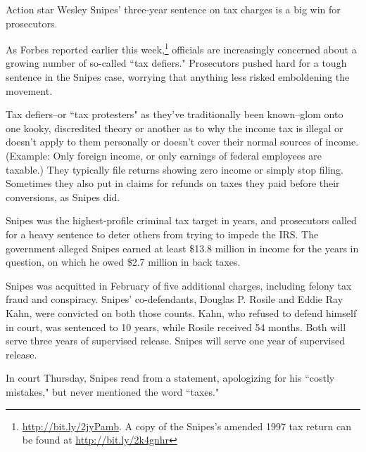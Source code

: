 \begin{select}

Action star Wesley Snipes' three-year sentence on tax charges is a big win for prosecutors.

As Forbes reported earlier this week,\footnote{\url{http://bit.ly/2jyPamb}. A copy of the Snipes's amended 1997 tax return can be found at \url{http://bit.ly/2k4gnhr}} officials are increasingly concerned about a growing number of so-called ``tax defiers." Prosecutors pushed hard for a tough sentence in the Snipes case, worrying that anything less risked emboldening the movement.

Tax defiers--or ``tax protesters" as they've traditionally been known--glom onto one kooky, discredited theory or another as to why the income tax is illegal or doesn't apply to them personally or doesn't cover their normal sources of income. (Example: Only foreign income, or only earnings of federal employees are taxable.) They typically file returns showing zero income or simply stop filing. Sometimes they also put in claims for refunds on taxes they paid before their conversions, as Snipes did. 

Snipes was the highest-profile criminal tax target in years, and prosecutors called for a heavy sentence to deter others from trying to impede the IRS. The government alleged Snipes earned at least \$13.8 million in income for the years in question, on which he owed \$2.7 million in back taxes. 

Snipes was acquitted in February of five additional charges, including felony tax fraud and conspiracy. Snipes' co-defendants, Douglas P. Rosile and Eddie Ray Kahn, were convicted on both those counts. Kahn, who refused to defend himself in court, was sentenced to 10 years, while Rosile received 54 months. Both will serve three years of supervised release. Snipes will serve one year of supervised release. 

In court Thursday, Snipes read from a statement, apologizing for his ``costly mistakes," but never mentioned the word ``taxes." 
\end{select}

